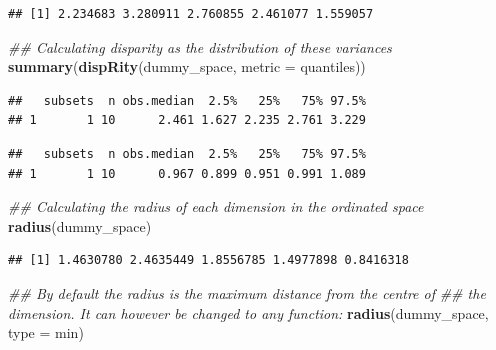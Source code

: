 \documentclass[]{book}
\newenvironment{Shaded}{\begin{snugshade}}{\end{snugshade}}
\newcommand{\CommentTok}[1]{\textcolor[rgb]{0.56,0.35,0.01}{\textit{#1}}}
\newcommand{\DataTypeTok}[1]{\textcolor[rgb]{0.13,0.29,0.53}{#1}}
\newcommand{\DecValTok}[1]{\textcolor[rgb]{0.00,0.00,0.81}{#1}}
\newcommand{\KeywordTok}[1]{\textcolor[rgb]{0.13,0.29,0.53}{\textbf{#1}}}
\newcommand{\NormalTok}[1]{#1}
\begin{document}
\begin{verbatim}
## [1] 2.234683 3.280911 2.760855 2.461077 1.559057
\end{verbatim}

\begin{Shaded}
\begin{Highlighting}[]
\CommentTok{## Calculating disparity as the distribution of these variances}
\KeywordTok{summary}\NormalTok{(}\KeywordTok{dispRity}\NormalTok{(dummy_space, }\DataTypeTok{metric =}\NormalTok{ quantiles))}
\end{Highlighting}
\end{Shaded}

\begin{verbatim}
##   subsets  n obs.median  2.5%   25%   75% 97.5%
## 1       1 10      2.461 1.627 2.235 2.761 3.229
\end{verbatim}

\begin{Shaded}
\end{Shaded}

\begin{verbatim}
##   subsets  n obs.median  2.5%   25%   75% 97.5%
## 1       1 10      0.967 0.899 0.951 0.991 1.089
\end{verbatim}

\begin{Shaded}
\begin{Highlighting}[]
\CommentTok{## Calculating the radius of each dimension in the ordinated space}
\KeywordTok{radius}\NormalTok{(dummy_space)}
\end{Highlighting}
\end{Shaded}

\begin{verbatim}
## [1] 1.4630780 2.4635449 1.8556785 1.4977898 0.8416318
\end{verbatim}

\begin{Shaded}
\begin{Highlighting}[]
\CommentTok{## By default the radius is the maximum distance from the centre of}
\CommentTok{## the dimension. It can however be changed to any function:}
\KeywordTok{radius}\NormalTok{(dummy_space, }\DataTypeTok{type =}\NormalTok{ min)}
\end{Highlighting}
\end{Shaded}
\end{document}
